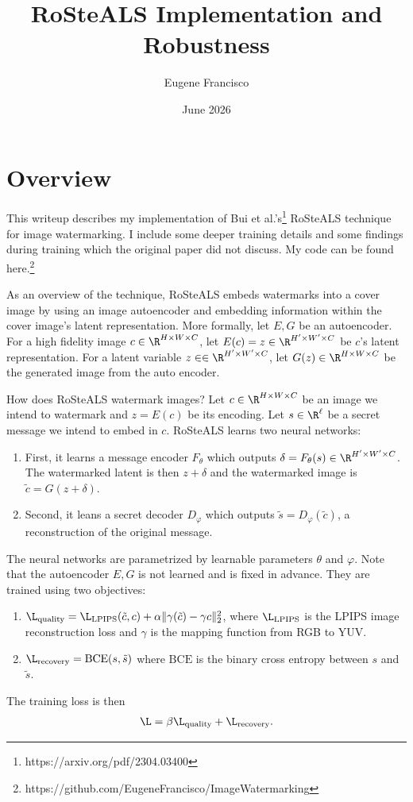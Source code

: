 \documentclass[twocolumn]{article}
\title{RoSteALS Implementation and Robustness}
\author{Eugene Francisco}
\date{June 2026}
\begin{document}
\maketitle
\section*{Overview}
This writeup describes my implementation of Bui et al.'s\footnote{https://arxiv.org/pdf/2304.03400} RoSteALS technique for image watermarking. I include some deeper training details and some findings during training which the original paper did not discuss. My code can be found here.\footnote{https://github.com/EugeneFrancisco/ImageWatermarking}

As an overview of the technique, RoSteALS embeds watermarks into a cover image by using an image autoencoder and embedding information within the cover image's latent representation. More formally, let $E, G$ be an autoencoder. For a high fidelity image $c\in \R^{H\times W\times C}$, let $E(c) = z\in \R^{H'\times W'\times C}$ be $c$'s latent representation. For a latent variable $z\in \in \R^{H'\times W'\times C}$, let $G(z)\in \R^{H\times W\times C}$ be the generated image from the auto encoder.

How does RoSteALS watermark images? Let $c\in \R^{H\times W\times C}$ be an image we intend to watermark and $z = E(c)$ be its encoding. Let $s\in \R^\ell$ be a secret message we intend to embed in $c$. RoSteALS learns two neural networks:
\begin{enumerate}[label=(\roman*)]
\item First, it 	learns a message encoder $F_\theta$ which outputs $\delta = F_\theta(s) \in \R^{H' \times W'\times C}$. The watermarked latent is then $z + \delta$ and the watermarked image is $\tilde c = G(z + \delta)$.
\item Second, it leans a secret decoder $D_\varphi$ which outputs $\tilde s = D_\varphi(\tilde c)$, a reconstruction of the original message.
\end{enumerate}
The neural networks are parametrized by learnable parameters $\theta$ and $\varphi$. Note that the autoencoder $E, G$ is not learned and is fixed in advance. They are trained using two objectives:
\begin{enumerate}[label=(\alph*)]
\item $\L_{\mathrm{quality}} = \L_{\mathrm{LPIPS}}(\tilde c, c) + \alpha \Vert \gamma(\tilde c) - \gamma{c}\Vert_2^2$, where $\L_{\mathrm{LPIPS}}$ is the LPIPS image reconstruction loss and $\gamma$ is the mapping function from RGB to YUV.
\item $\L_{\mathrm{recovery}} = \mathrm{BCE}(s, \tilde s)$ where $\mathrm{BCE}$ is the binary cross entropy between $s$ and $\tilde s$.
\end{enumerate}
The training loss is then
\begin{align*}
	\L = \beta\L_{\mathrm{quality}} + \L_{\text{recovery}}.
\end{align*}
\end{document}
